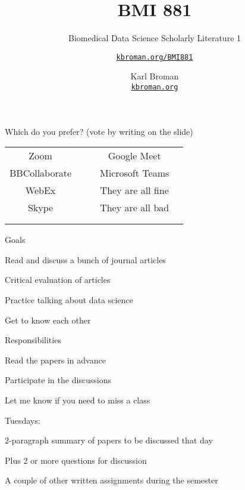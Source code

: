 \documentclass[aspectratio=169,12pt,t]{beamer}
\title{BMI 881}
\subtitle{Biomedical Data Science Scholarly Literature 1}
\author{\href{https://kbroman.org/BMI881}{\tt kbroman.org/BMI881} }
\institute{}
\date{\small \hspace{3in} Karl Broman \\
  \hspace{3in} \href{https://kbroman.org}{\color{foreground}
    \small \tt kbroman.org}}
\begin{document}
\begin{frame}[c]{Which do you prefer? {\hilit (vote by writing on the slide)}}

\renewcommand{\arraystretch}{2}
  \begin{tabular}{|c|c|c|c|c|} \cline{1-2} \cline{4-5}
    Zoom            &\hspace{1in} && Google Meet        & \hspace{1in}  \\ \cline{1-2} \cline{4-5}
    BBCollaborate   &&& Microsoft Teams                 & \\ \cline{1-2} \cline{4-5}
    WebEx           &&& They are all fine  & \\ \cline{1-2} \cline{4-5}
    Skype           &&& They are all bad   & \\ \cline{1-2} \cline{4-5}
                    &&&                    & \\ \cline{1-2} \cline{4-5}
                    &&&                    & \\ \cline{1-2} \cline{4-5}
   \end{tabular}

\end{frame}


{
\frame{
  \titlepage
} }




\begin{frame}{Goals}

  \bbi
\item Read and discuss a bunch of journal articles
\item Critical evaluation of articles
\item Practice talking about data science
\item Get to know each other
  \ei

\end{frame}




\begin{frame}{Responsibilities}

  \bbi
\item Read the papers in advance
\item Participate in the discussions
\item Let me know if you need to miss a class
\item Tuesdays:
  \bi
  \item 2-paragraph summary of papers to be discussed that day
  \item Plus 2 or more questions for discussion
  \ei
\item A couple of other written assignments during the semester
  \ei

\end{frame}
\end{document}
